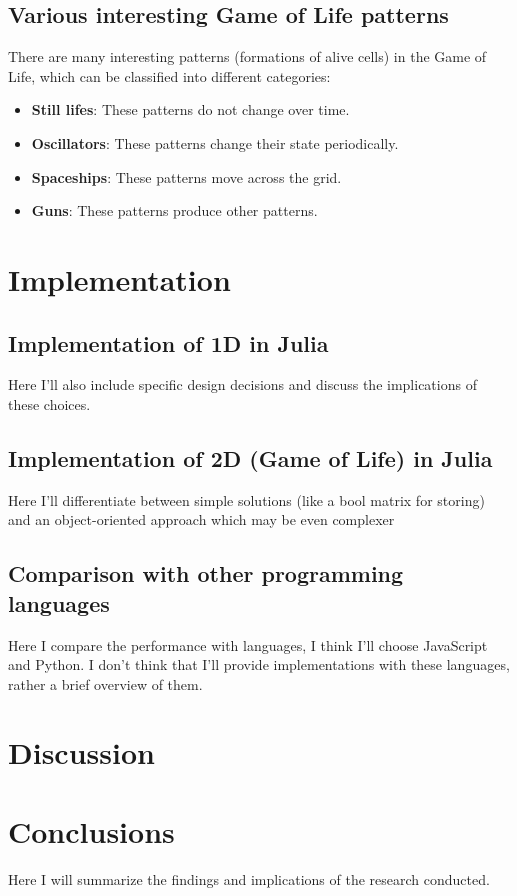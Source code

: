 \documentclass[a4paper,12pt]{llncs}
\numberwithin{equation}{section}
\begin{document}
\subsection{Various interesting Game of Life patterns}
There are many interesting patterns (formations of alive cells) in the Game of Life, which can be classified into different categories:
\begin{itemize}
  \item \textbf{Still lifes}: These patterns do not change over time.
  \item \textbf{Oscillators}: These patterns change their state periodically.
  \item \textbf{Spaceships}: These patterns move across the grid.
  \item \textbf{Guns}: These patterns produce other patterns.
\end{itemize}

\section{Implementation}
\subsection{Implementation of 1D in Julia}
Here I'll also include specific design decisions and discuss the implications of these choices.
\subsection{Implementation of 2D (Game of Life) in Julia}
Here I'll differentiate between simple solutions (like a bool matrix for storing)
and an object-oriented approach which may be even complexer
\subsection{Comparison with other programming languages}
Here I compare the performance with languages, I think I'll choose JavaScript and Python.
I don't think that I'll provide implementations with these languages, rather a brief overview of them.
\section{Discussion}
\section{Conclusions}
Here I will summarize the findings and implications of the research conducted.



\end{document}
